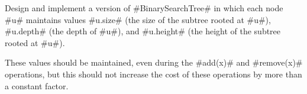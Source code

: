 \begin{exc}
  Design and implement a version of #BinarySearchTree# in which each node
  #u# maintains values #u.size# (the size of the subtree rooted at #u#),
  #u.depth# (the depth of #u#), and #u.height# (the height of the subtree
  rooted at #u#).  

  These values should be maintained, even during the #add(x)# and
  #remove(x)# operations, but this should not increase the cost of these
  operations by more than a constant factor.
\end{exc}

